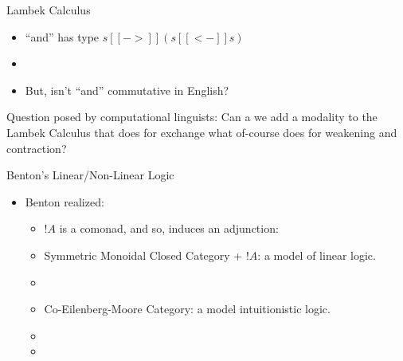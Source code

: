 \documentclass{beamer}
\begin{document}
\begin{frame}{Lambek Calculus}
  \begin{itemize}
  \item ``and'' has type $s [[->]] (s [[<-]] s)$
  \item[]
  \item But, isn't ``and'' commutative in English?
  \end{itemize}
  \begin{block}{Question posed by computational linguists:}
    Can a we add a modality to the Lambek Calculus that does for
    exchange what of-course does for weakening and contraction?
  \end{block}
\end{frame}

\begin{frame}{Benton's Linear/Non-Linear Logic}
  
  \begin{itemize}
  \item[] Benton realized:
    \begin{itemize}
    \item $!A$ is a comonad, and so, induces an adjunction:
      \begin{center}
      \end{center}

    \item Symmetric Monoidal Closed Category + $!A$: a model of linear logic.
    \item[]
    \item Co-Eilenberg-Moore Category: a model intuitionistic logic.
    \item[]
    \item[]
    \end{itemize}
  \end{itemize}
\end{frame}
\end{document}
